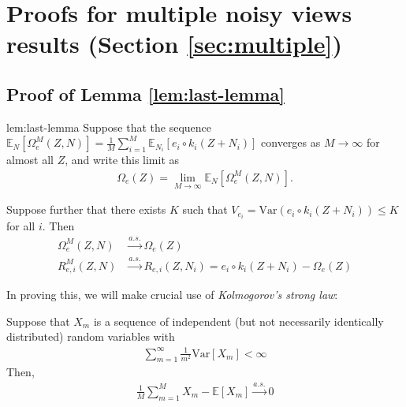 \section{Proofs for multiple noisy views results (Section \ref{sec:multiple})}

\subsection{Proof of Lemma \ref{lem:last-lemma}}
\label{appendix:last-lemma}

\begin{replemma}{lem:last-lemma}
	Suppose that the sequence $\mathbb{E}_{N}[\Omega_{e}^M(Z, N)] = \frac{1}{M}\sum_{i=1}^M \mathbb{E}_{N_i}[{e}_i\circ {k}_i( Z + N_i)] $ converges as $M \to \infty$ for almost all $Z$, and write this limit as
	\begin{align*}
	\Omega_e(Z) = \lim_{M\to\infty}\mathbb{E}_{N}[\Omega_{e}^M(Z, N)].
	\end{align*}
	
	Suppose further that there exists $K$ such that $V_{e_i} = \mathrm{Var}\left({e}_i \circ {k}_i(Z + N_i) \right) \leq K$ for all $i$.
	Then
	\begin{align*}
	\Omega_{e}^M(Z, N) & \overset{a.s.}{\longrightarrow} \Omega_{e}(Z) \\
	R_{e, i}^M(Z, N) & \overset{a.s.}{\longrightarrow} R_{e, i}(Z, N_i) = {e}_i\circ {k}_i( Z + N_i) - \Omega_{e}(Z)
	\end{align*}
\end{replemma}

In proving this, we will make crucial use of \emph{Kolmogorov's strong law}:

\medskip

\begin{theorem}
	Suppose that $X_m$ is a sequence of independent (but not necessarily identically distributed) random variables with
	\begin{align*}
	\sum_{m=1}^\infty \frac{1}{m^2}\mathrm{Var} [X_m] < \infty
	\end{align*}
	Then,
	\begin{align*}
	\frac{1}{M}\sum_{m=1}^M X_m - \mathbb{E}[X_m] \overset{a.s.}{\longrightarrow} 0
	\end{align*}
\end{theorem}


